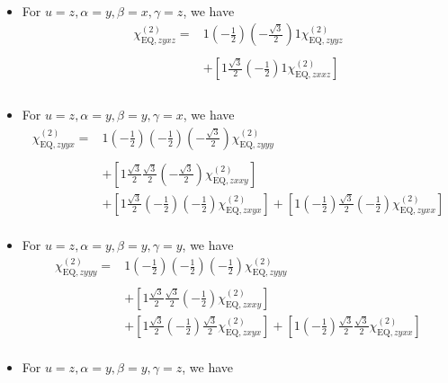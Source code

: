 \documentclass[UTF8,10pt,a4paper]{article}
\begin{document}
\begin{itemize}
\begin{align}
&
\end{align}\normalsize
\item For $u=z,\alpha=y,\beta=x,\gamma=z$, we have
\footnotesize\begin{align}
\nonumber\chi_{\text{EQ},zyxz}^{(2)}=&1\left(-\frac{1}{2}\right)\left(-\frac{\sqrt{3}}{2}\right)1\chi_{\text{EQ},zyyz}^{(2)}\\
\nonumber&\\
\nonumber&+\left[1\frac{\sqrt{3}}{2}\left(-\frac{1}{2}\right)1\chi_{\text{EQ},zxxz}^{(2)}\right]\\
\nonumber&\\
&
\end{align}\normalsize
\item For $u=z,\alpha=y,\beta=y,\gamma=x$, we have
\footnotesize\begin{align}
\nonumber\chi_{\text{EQ},zyyx}^{(2)}=&1\left(-\frac{1}{2}\right)\left(-\frac{1}{2}\right)\left(-\frac{\sqrt{3}}{2}\right)\chi_{\text{EQ},zyyy}^{(2)}\\
\nonumber&\\
\nonumber&+\left[1\frac{\sqrt{3}}{2}\frac{\sqrt{3}}{2}\left(-\frac{\sqrt{3}}{2}\right)\chi_{\text{EQ},zxxy}^{(2)}\right]\\
\nonumber&+\left[1\frac{\sqrt{3}}{2}\left(-\frac{1}{2}\right)\left(-\frac{1}{2}\right)\chi_{\text{EQ},zxyx}^{(2)}\right]+\left[1\left(-\frac{1}{2}\right)\frac{\sqrt{3}}{2}\left(-\frac{1}{2}\right)\chi_{\text{EQ},zyxx}^{(2)}\right]\\
&
\end{align}\normalsize
\item For $u=z,\alpha=y,\beta=y,\gamma=y$, we have
\footnotesize\begin{align}
\nonumber\chi_{\text{EQ},zyyy}^{(2)}=&1\left(-\frac{1}{2}\right)\left(-\frac{1}{2}\right)\left(-\frac{1}{2}\right)\chi_{\text{EQ},zyyy}^{(2)}\\
\nonumber&\\
\nonumber&+\left[1\frac{\sqrt{3}}{2}\frac{\sqrt{3}}{2}\left(-\frac{1}{2}\right)\chi_{\text{EQ},zxxy}^{(2)}\right]\\
\nonumber&+\left[1\frac{\sqrt{3}}{2}\left(-\frac{1}{2}\right)\frac{\sqrt{3}}{2}\chi_{\text{EQ},zxyx}^{(2)}\right]+\left[1\left(-\frac{1}{2}\right)\frac{\sqrt{3}}{2}\frac{\sqrt{3}}{2}\chi_{\text{EQ},zyxx}^{(2)}\right]\\
&
\end{align}\normalsize
\item For $u=z,\alpha=y,\beta=y,\gamma=z$, we have
\footnotesize\begin{align}

\end{align}
\end{itemize}
\end{document}
